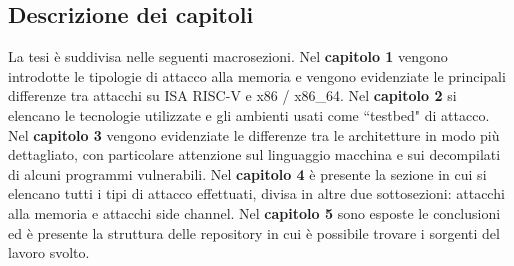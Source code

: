\subsection*{Descrizione dei capitoli}
La tesi è suddivisa nelle seguenti macrosezioni. Nel \textbf{capitolo 1} vengono introdotte le tipologie di attacco alla memoria e vengono evidenziate le principali differenze tra attacchi su ISA RISC-V e x86 / x86\_64. Nel \textbf{capitolo 2} si elencano le tecnologie utilizzate e gli ambienti usati come ``testbed" di attacco. Nel \textbf{capitolo 3} vengono evidenziate le differenze tra le architetture in modo più dettagliato, con particolare attenzione sul linguaggio macchina e sui decompilati di alcuni programmi vulnerabili. Nel \textbf{capitolo 4} è presente la sezione in cui si elencano tutti i tipi di attacco effettuati, divisa in altre due sottosezioni: attacchi alla memoria e attacchi side channel. Nel \textbf{capitolo 5} sono esposte le conclusioni ed è presente la struttura delle repository in cui è possibile trovare i sorgenti del lavoro svolto.
\newpage